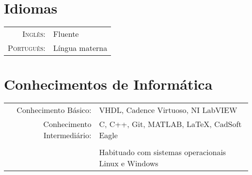 \documentclass[a4paper,10pt]{article} %
\begin{document}

\section{Idiomas}

\begin{tabular}{rl}
\textsc{Inglês:} & Fluente \\
\textsc{Português:} & Língua materna\\
\end{tabular}


\section{Conhecimentos de Informática}

\begin{tabular}{rl}
Conhecimento Básico: & VHDL, Cadence Virtuoso, NI LabVIEW\\
Conhecimento Intermediário: & C, C++, Git, MATLAB, LaTeX, CadSoft Eagle  \\
&\\
& Habituado com sistemas operacionais Linux e Windows\\
\end{tabular}
\end{document}
